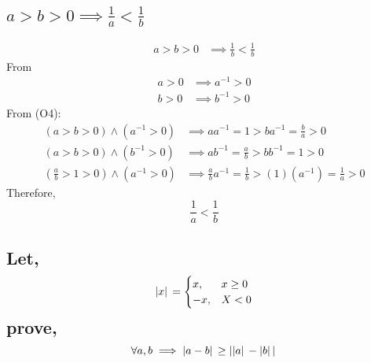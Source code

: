 \documentclass[]{article}
\begin{document}
\subsection{$a > b > 0 \implies \frac{1}{a} < \frac{1}{b}$}
\begin{align*}
    a > b > 0 &\implies \frac{1}{b} < \frac{1}{b}
\end{align*}
From 
\begin{align*}
    a > 0 & \implies a^{-1} > 0\\
    b > 0 & \implies b^{-1} > 0
\end{align*}
From (O4):
\begin{align*}
    (a > b > 0) \land (a^{-1} > 0) &\implies a a^{-1} = 1 > b a^{-1} = \frac{b}{a}> 0\\
    (a > b > 0) \land (b^{-1} > 0) &\implies a b^{-1} = \frac{a}{b} > b b^{-1} = 1 > 0\\
    (\frac{a}{b} > 1 > 0) \land (a^{-1} > 0)
        &\implies \frac{a}{b} a^{-1} = \frac{1}{b} > (1)(a^{-1}) = \frac{1}{a} > 0
\end{align*}
Therefore, $$\frac{1}{a} < \frac{1}{b}$$

\newpage
\subsection{
    Let,
    $$\abs*{x} = 
        \begin{cases}
            x, & x \geq 0\\
            -x,& X < 0
        \end{cases}
    $$
    prove,
    $$\forall a, b \implies \abs*{a - b} \geq \abs*{\abs*{a} - \abs*{b}}$$
}
\end{document}
